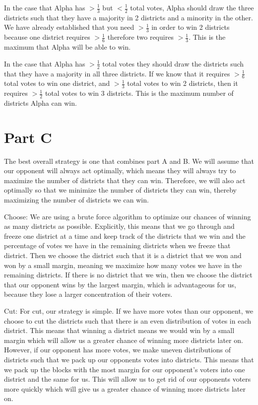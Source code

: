 \documentclass[12pt]{article}%
\begin{document}
In the case that Alpha has $>\frac{1}{3}$ but $< \frac{1}{2}$ total votes, Alpha should draw the three districts such that they have a majority in 2 districts and a minority in the other. We have already established that you need $> \frac{1}{3}$ in order to win 2 districts because one district requires $> \frac{1}{6}$ therefore two requires $> \frac{1}{3}$. This is the maximum that Alpha will be able to win.
\newline

In the case that Alpha has $>\frac{1}{2}$ total votes they should draw the districts such that they have a  majority in all three districts. If we know that it requires  $> \frac{1}{6}$ total votes to win one district, and $> \frac{1}{3}$  total votes to win 2 districts, then it requires $> \frac{1}{2}$ total votes to win 3 districts.  This is the maximum number of districts Alpha can win.
\newline

\section*{Part C}
The best overall strategy is one that combines part A and B. We will assume that our opponent will always act optimally, which means they will always try to maximize the number of districts that they can win. Therefore, we will also act optimally so that we minimize the number of districts they can win, thereby maximizing the number of districts we can win.
\newline 

Choose:  We are using a brute force algorithm to optimize our chances of winning as many districts as possible. Explicitly, this means that we go through and freeze one district at a time and keep track of the districts that we win and the percentage of votes we have in the remaining districts when we freeze that district. Then we choose the district such that it is a district that we won and won by a small margin, meaning we maximize how many votes we have in the remaining districts. If there is no district that we win, then we choose the district that our opponent wins by the largest margin, which is advantageous for us, because they lose a larger concentration of their voters.
\newline

Cut:  For cut, our strategy is simple.  If we have more votes than our opponent, we choose to cut the districts such that there is an even distribution of votes in each district. This means that winning a district means we would win by a small margin which will allow us a greater chance of winning more districts later on. However, if our opponent has more votes, we make uneven distributions of districts such that we pack up our opponents votes into districts. This means that we pack up the blocks with the most margin for our opponent's voters into one district and the same for us. This will allow us to get rid of our opponents voters more quickly which will give us a greater chance of winning more districts later on.
\newline 





  
  
  
  
  
  
\end{document}
